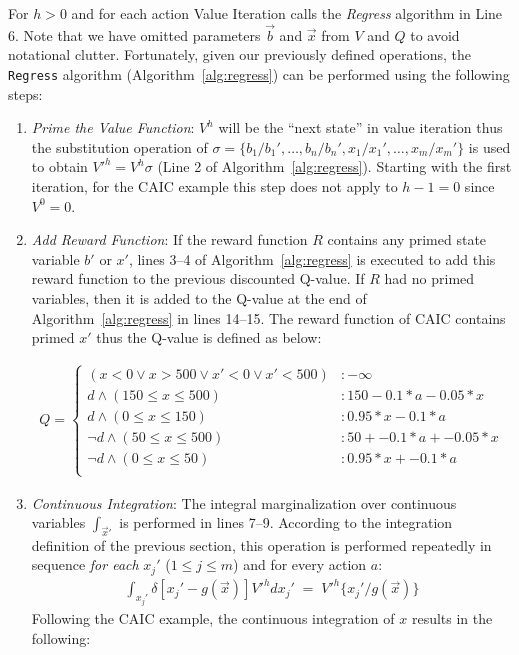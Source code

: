 \documentclass[twoside,11pt]{article}
\begin{document}
For $h > 0$ and for each action Value Iteration calls the \emph{Regress} algorithm in Line 6.  Note that we have omitted parameters $\vec{b}$ and
$\vec{x}$ from $V$ and $Q$ to avoid notational clutter.
Fortunately, given our previously defined
operations, the \texttt{Regress} algorithm (Algorithm~\ref{alg:regress}) can be performed using the following steps: 
\begin{enumerate}
\item {\it Prime the Value Function}: $V^{h}$ will be
the ``next state'' in value iteration thus the substitution operation of 
$\sigma = \{ b_1 / b_1', \ldots, b_n / b_n', x_1 / x_1', \ldots, x_m / x_m' \}$ is used to obtain
$V'^{h} = V^{h}\sigma$ (Line 2 of Algorithm~\ref{alg:regress}). Starting with the first iteration, for the \textsc{CAIC} example this step does not apply to $h-1=0$ since $V^0=0$.

\item {\it Add Reward Function}: If the reward function $R$ contains any primed state variable $b'$ or $x'$, lines 3--4 of Algorithm~\ref{alg:regress} is executed to add this reward function to the previous discounted Q-value. If $R$ had no primed variables, then it is added to the Q-value at the end of Algorithm~\ref{alg:regress} in lines 14--15. The reward function of \textsc{CAIC} contains primed $x'$ thus the Q-value is defined as below: 

{%
\begin{align}
Q = \begin{cases}
(x < 0 \vee x>500 \vee x'<0 \vee x'<500) &: -\infty \\
d \land (150 \leq x \leq 500) &:  150 - 0.1 * a - 0.05 * x \\
d \land (0 \leq x \leq 150) &:  0.95 * x - 0.1 * a \\
\neg d \land (50 \leq x \leq 500) &: 50 + -0.1 * a+ -0.05 * x \\
\neg d \land (0 \leq x \leq 50) &:  0.95 * x + -0.1 * a\\
\end{cases} \nonumber
\end{align}}
\item {\it Continuous Integration}: The integral
marginalization over continuous variables $\int_{\vec{x}'}$ is performed in lines 7--9. According to the integration definition of the previous section,  this operation is performed repeatedly in sequence \emph{for each}
$x_j'$ ($1 \leq j \leq m$) and for every action $a$: 
\begin{align*}
\int_{x_j'} \delta[x_j' - g(\vec{x})] V'^{h} dx_j' \; = \; V'^{h} \{x_j' / g(\vec{x}) \}  
\end{align*} 
Following the \textsc{CAIC} example, the continuous integration of $x$ results in the following: 


\end{enumerate}
\end{document}
